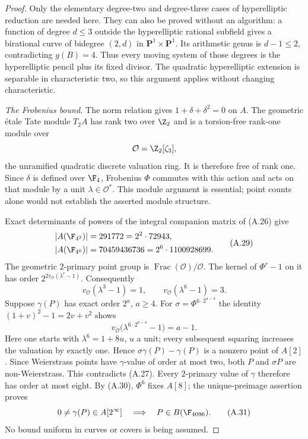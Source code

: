 \begin{proof}
Only the elementary degree-two and degree-three cases of
hyperelliptic reduction are needed here. They can also be
proved without an algorithm: a function of degree $d\le3$
outside the hyperelliptic rational subfield gives a
birational curve of bidegree $(2,d)$ in
$\mathbf P^1\times\mathbf P^1$. Its arithmetic genus is
$d-1\le2$, contradicting $g(B)=4$. Thus every moving
system of those degrees is the hyperelliptic pencil plus
its fixed divisor. The quadratic hyperelliptic extension
is separable in characteristic two, so this argument
applies without changing characteristic.

\emph{The Frobenius bound.}
The norm relation gives $1+\delta+\delta^2=0$ on $A$.
The geometric \'etale Tate module $T_2A$ has rank two
over $\Z_2$ and is a torsion-free rank-one module over
\[
 \mathcal O=\Z_2[\zeta_3],
\]
the unramified quadratic discrete valuation ring. It is
therefore free of rank one. Since $\delta$ is defined over
$\F_4$, Frobenius $\Phi$ commutes with this action and
acts on that module by a unit $\lambda\in\mathcal O^*$.
This module argument is essential; point counts alone
would not establish the asserted module structure.

Exact determinants of powers of the integral companion
matrix of (A.26) give
\[
 \begin{aligned}
 |A(\F_{4^3})|&=291772=2^2\cdot72943,\\
 |A(\F_{4^6})|&=70459436736=2^6\cdot1100928699.
 \end{aligned}                                         \tag{A.29}
\]
The geometric $2$-primary point group is
$\operatorname{Frac}(\mathcal O)/\mathcal O$. The kernel
of $\Phi^r-1$ on it has order
$2^{2v_{\mathcal O}(\lambda^r-1)}$. Consequently
\[
 v_{\mathcal O}(\lambda^3-1)=1,
 \qquad v_{\mathcal O}(\lambda^6-1)=3.                  \tag{A.30}
\]
Suppose $\gamma(P)$ has exact order $2^a$, $a\ge4$.
For $\sigma=\Phi^{6\cdot2^{a-4}}$ the identity
$(1+v)^2-1=2v+v^2$ shows
\[
 v_{\mathcal O}\bigl(\lambda^{6\cdot2^{a-4}}-1\bigr)
                                                          =a-1.
\]
Here one starts with $\lambda^6=1+8u$, $u$ a unit;
every subsequent squaring increases the valuation by
exactly one. Hence $\sigma\gamma(P)-\gamma(P)$ is a
nonzero point of $A[2]$. Since Weierstrass points have
$\gamma$-value of order at most two, both $P$ and
$\sigma P$ are non-Weierstrass. This contradicts (A.27).
Every $2$-primary value of $\gamma$ therefore has order
at most eight. By (A.30), $\Phi^6$ fixes $A[8]$; the
unique-preimage assertion proves
\[
 0\ne\gamma(P)\in A[2^\infty]
                  \quad\Longrightarrow\quad P\in B(\F_{4096}).
                                                               \tag{A.31}
\]
No bound uniform in curves or covers is being assumed.


\end{proof}
